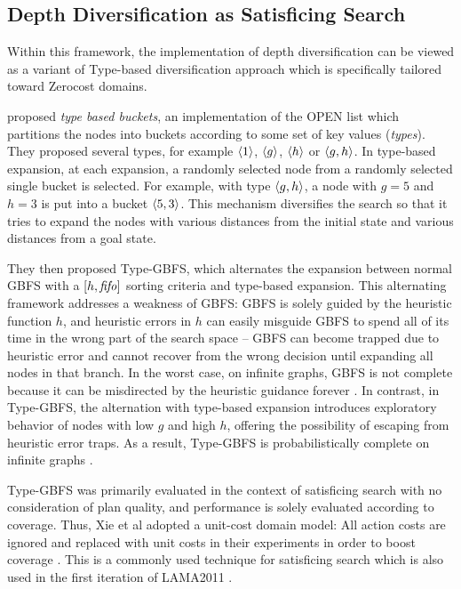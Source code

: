 \subsection{Depth Diversification as Satisficing Search}
\label{sec:depth-vs-types}
Within this framework, the implementation of depth diversification can be viewed as a variant of Type-based diversification approach \cite{xie14type} which is specifically tailored toward Zerocost domains.

\citeauthor{xie14type} proposed \emph{type based buckets}, an implementation of the OPEN list which partitions the nodes into buckets according to some set of key values (\emph{types}). They proposed several types, for example ${\left<1\right>}$, ${\left<g\right>}$, ${\left<h\right>}$ or ${\left<g,h\right>}$. In type-based expansion, at each expansion, a randomly selected node from a randomly selected single bucket is selected. For example, with type ${\left<g,h\right>}$, a node with $g=5$ and $h=3$ is put into a bucket  ${\left<5,3\right>}$. This mechanism diversifies the search so that it tries to expand the nodes with various distances from the initial state and various distances from a goal state.

They then proposed Type-GBFS, which alternates the expansion between normal GBFS with a $[h,{\text{\textit{fifo}}}]$ sorting criteria and type-based expansion. This alternating framework addresses a weakness of GBFS: 
GBFS is solely guided by the heuristic function $h$, and heuristic errors in $h$ can easily misguide GBFS to spend all of its time in the wrong part of the search space -- GBFS can become trapped due to heuristic error and cannot recover from the wrong decision until expanding all nodes in that branch.
In the worst case, on infinite graphs, GBFS is not complete because it can be misdirected by the heuristic guidance forever \cite{Valenzano2016}.
In contrast, in Type-GBFS, the alternation with type-based expansion introduces exploratory behavior of nodes with low $g$ and high $h$, offering the possibility of escaping from heuristic error traps.
As a result, Type-GBFS is probabilistically complete on infinite graphs \cite{Valenzano2016}.

Type-GBFS was primarily evaluated in the context of satisficing search with no consideration of plan quality, and performance is solely evaluated according to coverage.
Thus, Xie et al adopted a unit-cost domain model: All action costs are ignored and replaced with unit costs in their experiments in order to boost coverage \cite{xie14type}. This is a commonly used technique for satisficing search which is also used in the first iteration of LAMA2011 \cite{richter2011lama}. 

